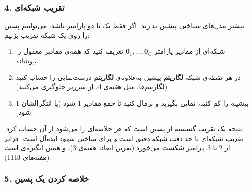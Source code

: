 \subsubsection{\texorpdfstring{4. تقریب شبکه‌ای }{4. تقریب شبکه‌ای (grid approximation)}}

بیشتر مدل‌های شناختی پیشین  ندارند. اگر فقط یک یا دو
پارامتر باشد، می‌توانیم پسین را روی یک شبکه تقریب بزنیم:

\begin{enumerate}
\def\labelenumi{\arabic{enumi}.}
\tightlist
\item
  شبکه‌ای از مقادیر پارامتر
  \(\boldsymbol\theta_1,\allowbreak \dots,\allowbreak \boldsymbol\theta_G\) تعریف کنید که همه‌ی
  مقادیر معقول را بپوشاند.
\item
  در هر نقطه‌ی شبکه \textbf{لگاریتم} پیشین به‌علاوه‌ی \textbf{لگاریتم}
  درست‌نمایی را حساب کنید (لگاریتم‌ها، مثل هفته‌ی 4، از سرریز جلوگیری
  می‌کنند).
\item
  بیشینه را کم کنید، نمایی بگیرید و نرمال کنید تا جمع مقادیر 1 شود (یا
  انتگرالشان 1 شود).
\end{enumerate}

نتیجه یک تقریب گسسته از پسین است که هر خلاصه‌ای را می‌شود از آن حساب کرد.
تقریب شبکه‌ای تا حد دقت شبکه دقیق است و برای ساختن شهود ایده‌آل است. فراتر
از 2 تا 3 پارامتر شکست می‌خورد (نفرین ابعاد، هفته‌ی 3)، و همین انگیزه‌ی
 است (هفته‌های 11\lr{--}13).

\subsubsection{5. خلاصه کردن یک پسین}

